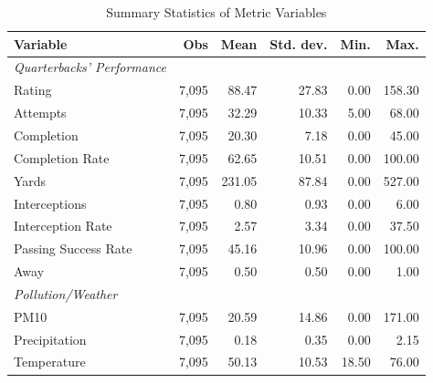 \documentclass[12pt,a4paper]{article}
\begin{document}
\begin{table}[h]
  \centering
  \caption{Summary Statistics of Metric Variables}
  \label{tab:summary-stats}
  \begin{tabular}{lrrrrr}
    \hline \hline
    Variable & Obs & Mean & Std. dev. & Min. & Max. \\
    \hline
    \textit{Quarterbacks' Performance} \\
    Rating & 7,095 & 88.47 & 27.83 & 0.00 & 158.30 \\
    Attempts & 7,095 & 32.29 & 10.33 & 5.00 & 68.00 \\
    Completion & 7,095 & 20.30 & 7.18 & 0.00 & 45.00 \\
    Completion Rate & 7,095 & 62.65 & 10.51 & 0.00 & 100.00 \\
    Yards & 7,095 & 231.05 & 87.84 & 0.00 & 527.00 \\
    Interceptions & 7,095 & 0.80 & 0.93 & 0.00 & 6.00 \\
    Interception Rate & 7,095 & 2.57 & 3.34 & 0.00 & 37.50 \\
    Passing Success Rate & 7,095 & 45.16 & 10.96 & 0.00 & 100.00 \\
    Away & 7,095 & 0.50 & 0.50 & 0.00 & 1.00 \\ [0.5cm]
    \textit{Pollution/Weather} \\
    PM10 & 7,095 & 20.59 & 14.86 & 0.00 & 171.00 \\
    Precipitation & 7,095 & 0.18 & 0.35 & 0.00 & 2.15 \\
    Temperature & 7,095 & 50.13 & 10.53 & 18.50 & 76.00 \\
    \hline \hline
  \end{tabular}
\end{table}
\end{document}
